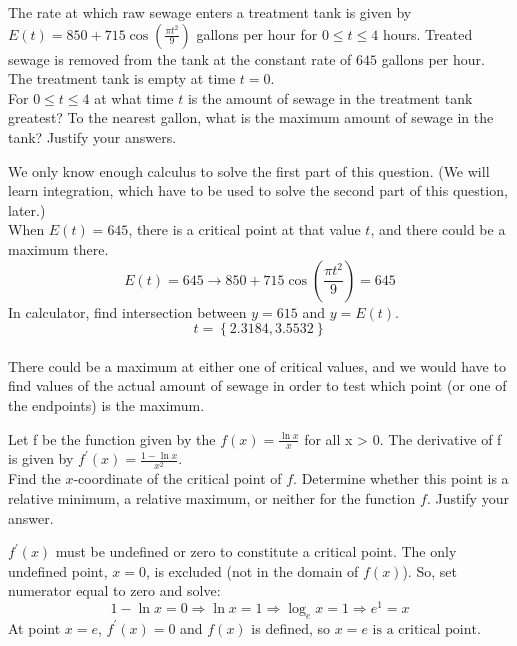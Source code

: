 \documentclass[12pt,letterpaper, onecolumn]{exam}
\begin{document}
\begin{questions}
\begin{solution}
		\end{solution}
		
		\setcounter{question}{6} \question The rate at which raw sewage enters a treatment tank is given by $E(t)=850+715\cos \left( \frac{\pi t^2}{9} \right) $ gallons per hour for $0 \leq t \leq 4$	hours. Treated sewage is removed from the tank at the constant rate of $645$ gallons per hour. The treatment tank is empty at time $t = 0$.\\
		For $0 \leq t \leq 4$ at what time $t$ is the amount of sewage in the treatment tank greatest? To the nearest gallon, what is the maximum amount of sewage in the tank? Justify your answers.
		\begin{solution}
			We only know enough calculus to solve the first part of this question. (We will learn integration, which have to be used to solve the second part of this question, later.) \\
			When $E(t)=645$, there is a critical point at that value $t$, and there could be a maximum there.
			$$E(t) = 645 \rightarrow 850 + 715 \cos \left( \frac{\pi t^2}{9} \right) = 645$$ 
			In calculator, find intersection between $y=615$ and $y=E(t)$. \\
			$$t = \left\lbrace 2.3184 , 3.5532 \right\rbrace$$ \\
			There could be a maximum at either one of critical values, and we would have to find values of the actual amount of sewage in order to test which point (or one of the endpoints) is the maximum.
		\end{solution}
		
		\setcounter{question}{9} \question Let f be the function given by the $f(x) = \frac{\ln x}{x}$ for all x > 0. The derivative of f is given by $f^\prime(x) = \frac{1-\ln x}{x^2}$. \\
		Find the $x$-coordinate of the critical point of $f$. Determine whether this point is a relative minimum, a relative maximum, or neither for the function $f$. Justify your answer.
		\begin{solution}
			$f^\prime(x)$ must be undefined or zero to constitute a critical point. 
			The only undefined point, $x=0$, is excluded (not in the domain of $f(x)$).
			So, set numerator equal to zero and solve:
			$$1-\ln x = 0 \Rightarrow \ln x = 1 \Rightarrow \log_e x = 1 \Rightarrow e^1 = x$$
			At point $x=e$, $f^\prime(x) = 0$ and $f(x)$ is defined, so $\boxed{x=e \text{ is a critical point.}}$
			

\end{solution}
\end{questions}
\end{document}
